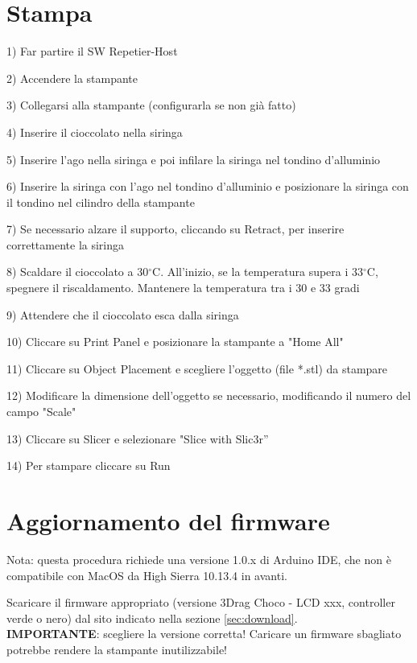 \documentclass[12pt]{article}
\begin{document}
\section{Stampa}

1) Far partire il SW Repetier-Host

2) Accendere la stampante

3) Collegarsi alla stampante (configurarla se non già fatto)

4) Inserire il cioccolato nella siringa

5) Inserire l'ago nella siringa e poi infilare la siringa nel tondino d'alluminio

6) Inserire la siringa con l'ago nel tondino d'alluminio e posizionare la siringa con il tondino nel cilindro della stampante

7) Se necessario alzare il supporto, cliccando su Retract, per inserire correttamente la siringa

8) Scaldare il cioccolato a 30$^{\circ}$C. All'inizio, se la temperatura supera i 33$^{\circ}$C, spegnere il riscaldamento. Mantenere la temperatura tra i 30 e 33 gradi

9) Attendere che il cioccolato esca dalla siringa

10) Cliccare su Print Panel e posizionare la stampante a "Home All"

11) Cliccare su Object Placement e scegliere l'oggetto (file *.stl) da stampare

12) Modificare la dimensione dell'oggetto se necessario, modificando il numero del campo "Scale"

13) Cliccare su Slicer e selezionare "Slice with Slic3r”

14) Per stampare cliccare su Run


\section{Aggiornamento del firmware}

	Nota: questa procedura richiede una versione 1.0.x di Arduino IDE, che non è compatibile con MacOS da High Sierra 10.13.4 in avanti.

	Scaricare il firmware appropriato (versione 3Drag Choco - LCD xxx, controller verde o nero) dal sito indicato nella sezione \ref{sec:download}.\\
	
	\textbf{IMPORTANTE}: scegliere la versione corretta! Caricare un firmware sbagliato potrebbe rendere la stampante inutilizzabile!\\
	
\end{document}
